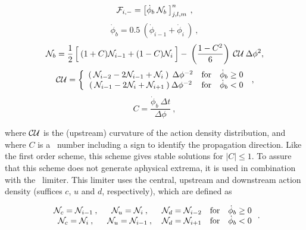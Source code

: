 \begin{equation}
{\cal F}_{i,-} = \left [ \dot{\phi}_b \: {\cal N}_b \: \right ]^n_{j,l,m} \: , \label{eq:quick_1}
\end{equation} \begin{equation}
\dot{\phi}_b = 0.5 \: \left ( \dot{\phi}_{i-1} + \dot{\phi}_i 
\: \right ) \: , \label{eq:quick_1a}
\end{equation}  \begin{equation}
\cN_b = \frac{1}{2} \left [ \rule[0mm]{0mm}{\baselineskip} \: 
(1+C)\cN_{i-1} + (1-C)\cN_i \: \right ] - \:
\left ( \frac{1-C^2}{6} \right ) \: {\cal CU} \: \Delta\phi^2, \label{eq:quick_2} \end{equation} \begin{equation}
{\cal CU} =  \left \{ \begin{array}{ccc}
(\: {\cal N}_{i-2} - 2{\cal N}_{i-1} + {\cal N}_{i} \:)\: \: \Delta \phi^{-2}
               & \mbox{for} & \dot{\phi}_b \geq 0 \\
(\: {\cal N}_{i-1} - 2{\cal N}_{i} + {\cal N}_{i+1} \:)\: \Delta \phi^{-2}
               & \mbox{for} & \dot{\phi}_b   <  0
\end{array} \right . \: , \label{eq:quick_3}
\end{equation} \begin{equation}
C = \frac{\dot{\phi}_b \: \Delta t}{\Delta \phi} 
\: , \label{eq:quick_4} \end{equation}

\noindent
where $\cal CU$ is the (upstream) curvature of the action density
distribution, and where $C$ is a \cfl\ number including a sign to identify the
propagation direction. Like the first order scheme, this scheme gives stable
solutions for $|C| \leq 1$. To assure that this scheme does not generate
aphysical extrema, it is used in combination with the \ult\ limiter. This
limiter uses the central, upstream and downstream action density (suffices
$c$, $u$ and $d$, respectively), which are defined as


\begin{equation} \begin{array}{ccccc}
{\cal N}_c = {\cal N}_{i-1} \: , \: & {\cal N}_u = {\cal N}_{ i } \: , \: &
                            {\cal N}_d = {\cal N}_{i-2} &
                            \mbox{for} & \dot{\phi}_b \geq 0 \\
{\cal N}_c = {\cal N}_{ i } \: , \: & {\cal N}_u = {\cal N}_{i-1} \: , \: &
                            {\cal N}_d = {\cal N}_{i+1} &
                            \mbox{for} & \dot{\phi}_b   <  0
\end{array} \: . \label{eq:ult_1} \end{equation}

